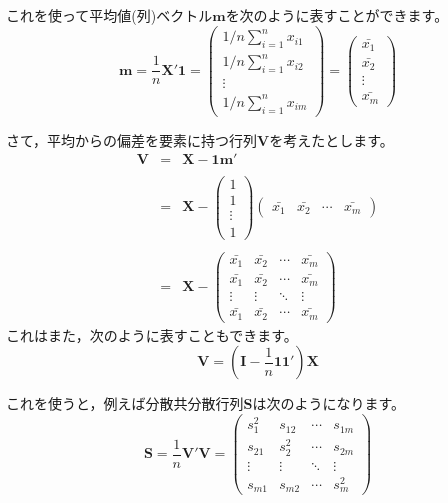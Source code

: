 \documentclass{ltjsbook}
\begin{document}
これを使って平均値(列)ベクトル$\bm{m}$を次のように表すことができます。
\[ \bm{m} = \frac{1}{n} \bm{X}' \bm{1} = \begin{pmatrix} 1/n\sum_{i=1}^{n} x_{i1} \\ 1/n\sum_{i=1}^{n} x_{i2} \\ \vdots \\ 1/n\sum_{i=1}^{n} x_{im} \end{pmatrix} = \begin{pmatrix}\bar{x_1} \\ \bar{x_2}\\ \vdots \\\bar{x_m} \end{pmatrix} \]


さて，平均からの偏差を要素に持つ行列$\bm{V}$を考えたとします。
\[
\begin{array}{ccl}
	\bm{V} & = & \bm{X} - \bm{1} \bm{m}' \\
&&\\
		 & = & \bm{X} - \begin{pmatrix} 1 \\ 1 \\ \vdots \\ 1 \end{pmatrix} \begin{pmatrix} \bar{x_1} & \bar{x_2} & \cdots & \bar{x_m} \end{pmatrix} \\
&&\\
		 & = & \bm{X} - \begin{pmatrix} \bar{x_1} & \bar{x_2} & \cdots & \bar{x_m} \\
	  	 							  \bar{x_1} & \bar{x_2} & \cdots & \bar{x_m} \\
	  	 							  \vdots    & \vdots    & \ddots & \vdots    \\
		 							  \bar{x_1} & \bar{x_2} & \cdots & \bar{x_m} \end{pmatrix}
\end{array}
\]
これはまた，次のように表すこともできます。
\[ \bm{V} = ( \bm{I} -\frac{1}{n}\bm{1} \bm{1} ')\bm{X} \]


これを使うと，例えば分散共分散行列$\bm{S}$は次のようになります。
\[ \bm{S} = \frac{1}{n} \bm{V}' \bm{V} = \begin{pmatrix} 
												s_1^2 & s_{12} & \cdots & s_{1m} \\
												   s_{21} & s_2^2 & \cdots & s_{2m} \\
												   \vdots & \vdots & \ddots & \vdots \\
												   s_{m1} & s_{m2} & \cdots & s_m^2 \end{pmatrix} \]
\end{document}
